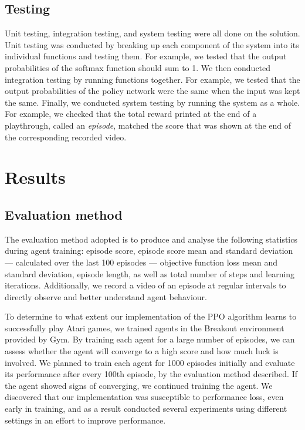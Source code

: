 \documentclass[12pt,a4paper]{article}
\begin{document}
\subsection{Testing}
Unit testing, integration testing, and system testing were all done on the solution. Unit testing was conducted by breaking up each component of the system into its individual functions and testing them. For example, we tested that the output probabilities of the softmax function should sum to 1. We then conducted integration testing by running functions together. For example, we tested that the output probabilities of the policy network were the same when the input was kept the same. Finally, we conducted system testing by running the system as a whole. For example, we checked that the total reward printed at the end of a playthrough, called an \emph{episode}, matched the score that was shown at the end of the corresponding recorded video.

\section{Results}
\subsection{Evaluation method}
The evaluation method adopted is to produce and analyse the following statistics during agent training: episode score, episode score mean and standard deviation --- calculated over the last 100 episodes --- objective function loss mean and standard deviation, episode length, as well as total number of steps and learning iterations. Additionally, we record a video of an episode at regular intervals to directly observe and better understand agent behaviour.

To determine to what extent our implementation of the PPO algorithm learns to successfully play Atari games, we trained agents in the Breakout environment provided by Gym. By training each agent for a large number of episodes, we can assess whether the agent will converge to a high score and how much luck is involved. We planned to train each agent for 1000 episodes initially and evaluate its performance after every 100th episode, by the evaluation method described. If the agent showed signs of converging, we continued training the agent. We discovered that our implementation was susceptible to performance loss, even early in training, and as a result conducted several experiments using different settings in an effort to improve performance.
\end{document}
